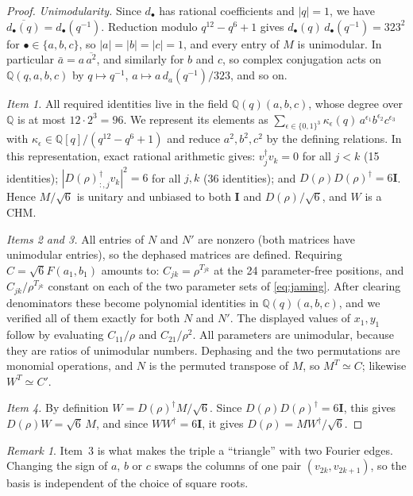 \documentclass[11pt]{article}
\numberwithin{equation}{section}
\theoremstyle{plain}
\theoremstyle{definition}
\theoremstyle{remark}
\newtheorem{remark}[theorem]{Remark}
\newcommand{\Q}{\mathbb{Q}}
\newcommand{\I}{\mathbf{I}}
\newcommand{\dg}{^{\dagger}}
\begin{document}
\begin{proof}
\emph{Unimodularity.} Since $d_\bullet$ has rational coefficients and $|q|=1$, we have $\overline{d_\bullet(q)}=d_\bullet(q^{-1})$. Reduction modulo $q^{12}-q^6+1$ gives $d_\bullet(q)\,d_\bullet(q^{-1})=323^2$ for $\bullet\in\{a,b,c\}$, so $|a|=|b|=|c|=1$, and every entry of $M$ is unimodular. In particular $\bar a=a\,\overline{a^2}$, and similarly for $b$ and $c$, so complex conjugation acts on $\Q(q,a,b,c)$ by $q\mapsto q^{-1}$, $a\mapsto a\,d_a(q^{-1})/323$, and so on.

\emph{Item 1.} All required identities live in the field $\Q(q)(a,b,c)$, whose degree over $\Q$ is at most $12\cdot2^3=96$. We represent its elements as $\sum_{\epsilon\in\{0,1\}^3}\kappa_\epsilon(q)\,a^{\epsilon_1}b^{\epsilon_2}c^{\epsilon_3}$ with $\kappa_\epsilon\in\Q[q]/(q^{12}-q^6+1)$ and reduce $a^2,b^2,c^2$ by the defining relations. In this representation, exact rational arithmetic gives: $v_j\dg v_k=0$ for all $j<k$ (15 identities); $|D(\rho)_{:,j}\dg v_k|^2=6$ for all $j,k$ (36 identities); and $D(\rho)D(\rho)\dg=6\I$. Hence $M/\sqrt6$ is unitary and unbiased to both $\I$ and $D(\rho)/\sqrt6$, and $W$ is a CHM.

\emph{Items 2 and 3.} All entries of $N$ and $N'$ are nonzero (both matrices have unimodular entries), so the dephased matrices are defined. Requiring $C=\sqrt6F(a_1,b_1)$ amounts to: $C_{jk}=\rho^{T_{jk}}$ at the 24 parameter-free positions, and $C_{jk}/\rho^{T_{jk}}$ constant on each of the two parameter sets of \eqref{eq:jaming}. After clearing denominators these become polynomial identities in $\Q(q)(a,b,c)$, and we verified all of them exactly for both $N$ and $N'$. The displayed values of $x_1,y_1$ follow by evaluating $C_{11}/\rho$ and $C_{21}/\rho^2$. All parameters are unimodular, because they are ratios of unimodular numbers. Dephasing and the two permutations are monomial operations, and $N$ is the permuted transpose of $M$, so $M^{T}\simeq C$; likewise $W^{T}\simeq C'$.

\emph{Item 4.} By definition $W=D(\rho)\dg M/\sqrt6$. Since $D(\rho)D(\rho)\dg=6\I$, this gives $D(\rho)W=\sqrt6\,M$, and since $WW\dg=6\I$, it gives $D(\rho)=M W\dg/\sqrt6$.
\end{proof}

\begin{remark}
Item~3 is what makes the triple a ``triangle'' with two Fourier edges. Changing the sign of $a$, $b$ or $c$ swaps the columns of one pair $(v_{2k},v_{2k+1})$, so the basis is independent of the choice of square roots.
\end{remark}
\end{document}
